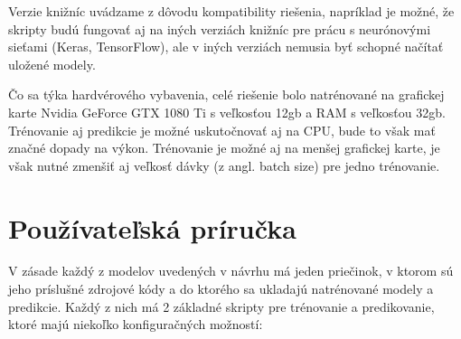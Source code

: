 Verzie knižníc uvádzame z dôvodu kompatibility riešenia, napríklad je možné, že skripty budú fungovať aj na iných verziách knižníc pre prácu s neurónovými sieťami (Keras, TensorFlow), ale v iných verziách nemusia byť schopné načítať uložené modely. 

Čo sa týka hardvérového vybavenia, celé riešenie bolo natrénované na grafickej karte Nvidia GeForce GTX 1080 Ti s veľkosťou 12gb a RAM s veľkosťou 32gb. Trénovanie aj predikcie je možné uskutočnovať aj na CPU, bude to však mať značné dopady na výkon. Trénovanie je možné aj na menšej grafickej karte, je však nutné zmenšiť aj veľkosť dávky (z angl. batch size) pre jedno trénovanie.
\newpage
\null
\thispagestyle{empty}
\newpage
\section{Používateľská príručka}

V zásade každý z modelov uvedených v návrhu má jeden priečinok, v ktorom sú jeho príslušné zdrojové kódy a do ktorého sa ukladajú natrénované modely a predikcie. Každý z nich má 2 základné skripty pre trénovanie a predikovanie, ktoré majú niekoľko konfiguračných možností:

